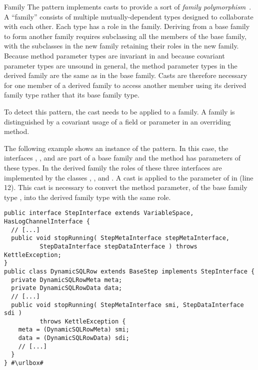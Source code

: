 \begin{pattern}{Family}
The \thisp{} pattern implements casts to provide a sort of
\emph{family polymorphism}~\citep{ernstFamilyPolymorphism2001}.
A ``family'' consists of multiple mutually-dependent types designed to
collaborate with each other.
Each type has a role in the family.
Deriving from a base family to form another family requires subclassing all the members of the base family,
with the subclasses in the new family retaining their roles in the new family.
Because method parameter types are invariant in \java{} and because covariant parameter types are unsound in general,
the method parameter types in the derived family are the same as in the base family.
Casts are therefore necessary for one member of a derived family to access
another member using its derived family type rather that its base family
type.

To detect this pattern, the cast needs to be applied to a family.
A family is distinguished by a covariant usage of a field or parameter in an overriding method.

\instances{}
The following example shows an instance of the \thisp{} pattern.
In this case, the interfaces , ,
and  are part of a base family and the
 method has parameters of these types.
In the derived family the roles of these three interfaces are
implemented by the classes
,
, and
.
A cast is applied to the parameter  of  in
 (line 12).
This cast is necessary to convert the method parameter,
of the base family type ,
into the derived family type with the same role.
\def\urlvar{http://bit.ly/pentaho_pentaho_kettle_2FN59J8}
\begin{verbatim}
public interface StepInterface extends VariableSpace, HasLogChannelInterface {
  // [...]
  public void stopRunning( StepMetaInterface stepMetaInterface,
          StepDataInterface stepDataInterface ) throws KettleException;
}
public class DynamicSQLRow extends BaseStep implements StepInterface {
  private DynamicSQLRowMeta meta;
  private DynamicSQLRowData data;
  // [...]
  public void stopRunning( StepMetaInterface smi, StepDataInterface sdi )
          throws KettleException {
    meta = (DynamicSQLRowMeta) smi;
    data = (DynamicSQLRowData) sdi;
    // [...]
  }
} #\urlbox#
\end{verbatim}


\end{pattern}
